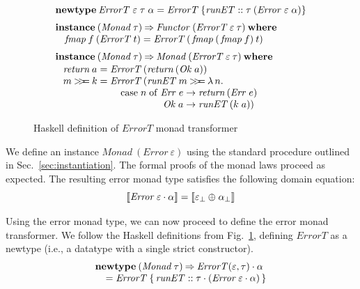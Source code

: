 \documentclass{sigplanconf}
\newcommand{\hsbind}{\mathbin{>\mkern-6mu>\mkern-6.5mu=}}
\newcommand{\To}{\mathbin{\Rightarrow}}
\newcommand{\REP}[1]{\ensuremath{\llbracket#1\rrbracket}}
\newcommand{\hair}{\mskip1mu}
\newcommand{\kwd}[1]{\mathbf{#1}}
\newcommand{\hsc}[1]{\ensuremath{\mathit{#1}}}
\newcommand{\fmap}{\,\hsc{fmap}} %
\newcommand{\runET}{\hsc{runET}}
\newcommand{\tA}{\alpha}
\newcommand{\tE}{\varepsilon}
\newcommand{\tT}{\tau}
\theoremstyle{definition}
\begin{document}
\begin{figure}
\begin{align*}
  & \kwd{newtype}\:\hsc{ErrorT}\;\tE\;\tT\;\tA = \hsc{ErrorT}\:\{ \runET::\tT\:(\hsc{Error}\;\tE\;\tA) \}
  \\[\jot]
  & \kwd{instance}\:(\hsc{Monad}\:\tT) \To \hsc{Functor}\:(\hsc{ErrorT}\:\tE\:\tT)\:\kwd{where}
  \\[-\jot]
  & \hspace{8pt} \fmap\:f\:(\hsc{ErrorT}\:t) = \hsc{ErrorT}\,(\fmap\:(\fmap\:f)\:t)
  \\[\jot]
  & \kwd{instance}\:(\hsc{Monad}\:\tT) \To \hsc{Monad}\:(\hsc{ErrorT}\:\tE\:\tT)\:\kwd{where}
  \\[-\jot]
  & \hspace{8pt}
  \begin{alignedat}{2}
    & \hsc{return}\:a &&= \hsc{ErrorT}\,(\hsc{return}\,(\hsc{Ok}\;a)) \\[-\jot]
    & m \hsbind k &&= \hsc{ErrorT}\,(\runET\:m \hsbind \lambda\,n. \\[-\jot]
    & && \hspace{24pt} \mathrm{case}\;n\;\mathrm{of}\;
    \begin{aligned}[t]
      \hsc{Err}\;e &\to \hsc{return}\,(\hsc{Err}\;e) \\[-\jot]
      \hsc{Ok}\;a &\to \runET\,(k\;a))
    \end{aligned}
  \end{alignedat}
\end{align*}
\caption{Haskell definition of \hsc{ErrorT} monad transformer}
\label{fig:errorT}
\end{figure}

We define an instance $\hsc{Monad}\:(\hsc{Error}\:\tE)$ using the standard procedure outlined in Sec.~\ref{sec:instantiation}. The formal proofs of the monad laws proceed as expected. The resulting error monad type satisfies the following domain equation:
%
\begin{equation}
\REP{\hsc{Error}\:\tE\cdot\tA} = \REP{\tE_\bot\oplus\hair\tA_\bot}
\end{equation}

Using the error monad type, we can now proceed to define the error monad transformer.
We follow the Haskell definitions from Fig.~\ref{fig:errorT}, defining \hsc{ErrorT} as a newtype (i.e., a datatype with a single strict constructor).
%
\begin{align*}
& \kwd{newtype}\:(\hsc{Monad}\:\tT) \To \hsc{ErrorT}(\tE,\tT)\cdot\tA \\[-\jot]
& \hspace{8pt} = \hsc{ErrorT}\:\{\,\runET :: \tT\cdot(\hsc{Error}\:\tE\cdot\tA)\,\}
\end{align*}
\end{document}
